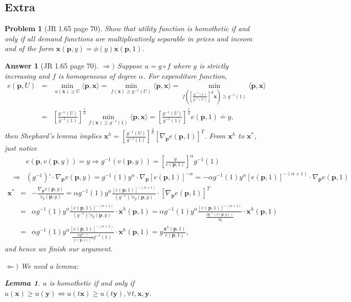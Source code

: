 \documentclass{article}
\newtheorem*{ans}{Answer}
\newtheorem*{prob}{{\bf Problem}}
\newtheorem{lem}[theorem]{Lemma}
\newcommand{\1}{{\bf 1}}
\newcommand{\0}{{\mathbf{0}}}
\newcommand{\p}{{\mathbf{p}}}
\newcommand{\x}{{\mathbf{x}}}
\newcommand{\y}{{\mathbf{y}}}
\newcommand{\<}{\langle}
\renewcommand{\>}{\rangle}
\begin{document}
\subsection{Extra}
\begin{prob}[JR 1.65 page 70] Show that utility function is homothetic if and only if all demand functions are multiplicatively separable in prices and inceom and of the form $\x(\p,y) = \phi(y) \x(\p,1)$.
\end{prob}
\begin{ans}[JR 1.65 page 70]$\Rightarrow)$ Suppose $u = g \circ f$ where $g $ is strictly increasing and $f$ is homogeneous of degree $\alpha $.
	For expenditure function,
\begin{eqnarray*}
e(\p, U ) & =  & \min_{u(\x) \ge U} \langle \p , \x \rangle     = \min_{  f (\x) \ge g^{-1} (U)} \langle \p , \x \rangle   = \min_{  f \left( \left[  \frac{ g^{-1} (1)}{g^{-1} (U)}\right]^{\frac1{\alpha}}\x \right)  \ge g^{-1} (1)}  \langle \p , \x \rangle  \\
& = &  \left[  \frac{ g^{-1} (U)}{g^{-1} (1)}\right]^{\frac1{\alpha}} \min_{  f \left(  \x \right)  \ge g^{-1} (1)}  \langle \p , \x \rangle  = \left[  \frac{ g^{-1} (U)}{g^{-1} (1)}\right]^{\frac1{\alpha}} e(\p, 1) \doteq y ,
\end{eqnarray*}
then Shephard's lemma implies  $\x^h = \left[  \frac{ g^{-1} (U)}{g^{-1} (1)}\right]^{\frac1{\alpha}}\left[\nabla_{\p}e(\p,1)\right]^T$. From $\x^h$ to $\x^*$, just notice
\begin{eqnarray*}
&& e(\p, v(\p,y) ) = y  \Rightarrow g^{-1}( v(\p,y) ) = \left[\frac{y}{e(\p,1)}\right]^{\alpha}g^{-1}(1) \\
& \Rightarrow & \left(g^{-1}\right)' \cdot \nabla_{\p} v(\p,y)  = g^{-1}(1)y^{\alpha } \cdot \nabla_{\p}\left[e(\p,1)\right]^{-\alpha} = -\alpha g^{-1}(1)y^{\alpha } \left[e(\p,1)\right]^{-(\alpha+1 )}\cdot \nabla_{\p} e(\p,1) 
\end{eqnarray*}
\begin{eqnarray*}
 \x^* & =  & - \frac{\nabla_{\p} v(\p,y)}{v_y(\p,y) }  =  \alpha g^{-1}(1)y^{\alpha }  \frac{ \left[e(\p,1)\right]^{-(\alpha+1 )}}{\left(g^{-1}\right)' v_y(\p,y) }\cdot \left[\nabla_{\p} e(\p,1)\right]^T  \\& = & \alpha g^{-1}(1)y^{\alpha }  \frac{ \left[e(\p,1)\right]^{-(\alpha+1 )}}{\left(g^{-1}\right)' v_y(\p,y) }\cdot \x^h (\p,1) = \alpha g^{-1}(1)y^{\alpha }  \frac{ \left[e(\p,1)\right]^{-(\alpha+1 )}}{\frac{ \partial  g^{-1}(v(\p,y))}{\partial y}  }\cdot \x^h (\p,1)  \\
 & = &\alpha g^{-1}(1)y^{\alpha }  \frac{ \left[e(\p,1)\right]^{-(\alpha+1 )}}{\frac{\alpha y^{\alpha - 1}}{\left[  e(\p,1) \right]^{\alpha} }g^{-1}(1)  }\cdot \x^h (\p,1)  =   y \frac{    \x^h (\p,1)   }{ e(\p,1)   },
\end{eqnarray*}
and hence we finish our argument.


$\Leftarrow)$ We need a lemma:
\begin{lem}
	$u$ is homothetic if and only if $u(\x) \ge u(\y) \Leftrightarrow u(t\x) \ge u(t\y),\forall t,\x,\y$.
\end{lem}
\end{ans}
\end{document}
